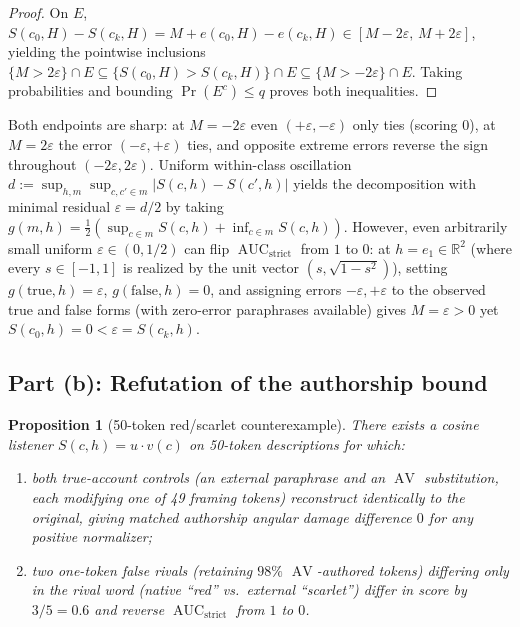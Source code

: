 \documentclass[11pt]{article}
\theoremstyle{plain}
\newtheorem{proposition}[theorem]{Proposition}
\theoremstyle{definition}
\theoremstyle{remark}
\DeclareMathOperator{\AUC}{AUC}
\DeclareMathOperator{\AV}{AV}
\begin{document}
\begin{proof}
On $E$, $S(c_0, H) - S(c_k, H) = M + e(c_0, H) - e(c_k, H) \in [M - 2\varepsilon,\, M + 2\varepsilon]$, yielding the pointwise inclusions $\{M > 2\varepsilon\} \cap E \subseteq \{S(c_0, H) > S(c_k, H)\} \cap E \subseteq \{M > -2\varepsilon\} \cap E$. Taking probabilities and bounding $\Pr(E^c) \le q$ proves both inequalities.
\end{proof}

Both endpoints are sharp: at $M = -2\varepsilon$ even $(+\varepsilon, -\varepsilon)$ only ties (scoring $0$), at $M = 2\varepsilon$ the error $(-\varepsilon, +\varepsilon)$ ties, and opposite extreme errors reverse the sign throughout $(-2\varepsilon, 2\varepsilon)$.
Uniform within-class oscillation $d := \sup_{h,m} \sup_{c, c' \in m} |S(c, h) - S(c', h)|$ yields the decomposition with minimal residual $\varepsilon = d/2$ by taking $g(m, h) = \frac{1}{2}(\sup_{c \in m} S(c, h) + \inf_{c \in m} S(c, h))$.
However, even arbitrarily small uniform $\varepsilon \in (0, 1/2)$ can flip $\AUC_{\mathrm{strict}}$ from $1$ to $0$: at $h = e_1 \in \mathbb{R}^2$ (where every $s \in [-1, 1]$ is realized by the unit vector $(s, \sqrt{1-s^2})$), setting $g(\text{true}, h) = \varepsilon$, $g(\text{false}, h) = 0$, and assigning errors $-\varepsilon, +\varepsilon$ to the observed true and false forms (with zero-error paraphrases available) gives $M = \varepsilon > 0$ yet $S(c_0, h) = 0 < \varepsilon = S(c_k, h)$.

\subsection{Part (b): Refutation of the authorship bound}

\begin{proposition}[50-token red/scarlet counterexample]\label{prop:authorship}
There exists a cosine listener $S(c, h) = u \cdot v(c)$ on 50-token descriptions for which:
\begin{enumerate}[label=\textup{(\arabic*)},leftmargin=2em,itemsep=2pt]
\item both true-account controls (an external paraphrase and an $\AV$ substitution, each modifying one of 49 framing tokens) reconstruct identically to the original, giving matched authorship angular damage difference $0$ for any positive normalizer;
\item two one-token false rivals (retaining $98\%$ $\AV$-authored tokens) differing only in the rival word (native ``red'' vs.\ external ``scarlet'') differ in score by $3/5 = 0.6$ and reverse $\AUC_{\mathrm{strict}}$ from $1$ to $0$.
\end{enumerate}
\end{proposition}
\end{document}
